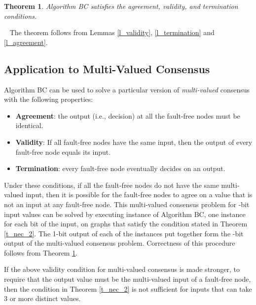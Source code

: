 \documentclass[letterpaper, 11pt]{article}
\newenvironment{proof}{\noindent {\bf Proof:}~}{\hspace*{\fill}}
\newtheorem{theorem}{Theorem}
\begin{document}
\begin{theorem}
\label{t_correct}
Algorithm BC satisfies the agreement, validity, and termination conditions.
\end{theorem}

\begin{proof}
The theorem follows from Lemmas \ref{l_validity}, \ref{l_termination} and \ref{l_agreement}.
\end{proof}

\subsection{Application to Multi-Valued Consensus}

Algorithm BC can be used to solve a particular version of {\em multi-valued} consensus with the following properties: 

\begin{itemize}
\item \textbf{Agreement}: the output (i.e., decision) at all the fault-free nodes must be identical.

\item \textbf{Validity}: If all fault-free nodes have the same input, then the output of every fault-free node equals its input.

\item \textbf{Termination}: every fault-free node eventually decides on an output.

\end{itemize}
Under these conditions, if all the fault-free nodes do not have the same multi-valued input,
then it is possible for
the fault-free nodes to agree on a value that is not an input at any fault-free node.
This multi-valued consensus problem for -bit input values can be solved by executing
 instance of Algorithm BC, one instance for each bit of the input, on graphs
that satisfy the condition stated in Theorem \ref{t_nec_2}.
The 1-bit output of each of the  instances put together form the -bit output
of the multi-valued consensus problem. Correctness of this procedure follows from
Theorem \ref{t_correct}.

If the above validity condition for multi-valued consensus is made stronger, to require that the
output value must be the multi-valued input of a fault-free node, then the condition
in Theorem \ref{t_nec_2} is not sufficient for inputs that can take 3 or more distinct values.  
\end{document}
